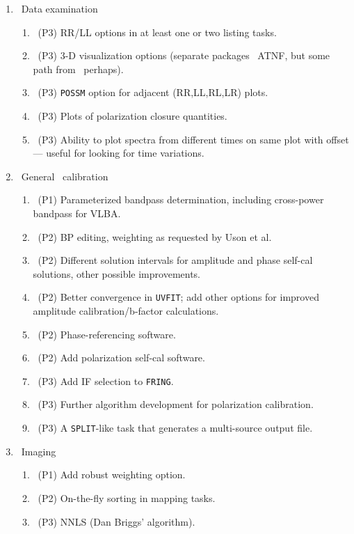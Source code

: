 \begin{enumerate}
\item\ Data examination
   \begin{enumerate}
   \item\ (P3) RR/LL options in at least one or two listing tasks.
   \item\ (P3) 3-D visualization options (separate packages \eg\ ATNF,
              but some path from \AIPS\ perhaps).
   \item\ (P3) {\tt POSSM} option for adjacent (RR,LL,RL,LR) plots.
   \item\ (P3) Plots of polarization closure quantities.
   \item\ (P3) Ability to plot spectra from different times on same
              plot with offset --- useful for looking for time
              variations.
   \end{enumerate}
\item\ General \uv\ calibration
   \begin{enumerate}
   \item\ (P1) Parameterized bandpass determination, including
              cross-power bandpass for \hbox{VLBA}.
   \item\ (P2) BP editing, weighting as requested by Uson et al.
   \item\ (P2) Different solution intervals for amplitude and phase
              self-cal solutions, other possible improvements.
   \item\ (P2) Better convergence in {\tt UVFIT}; add other options for
              improved amplitude calibration/b-factor calculations.
   \item\ (P2) Phase-referencing software.
   \item\ (P2) Add polarization self-cal software.
   \item\ (P3) Add IF selection to \hbox{{\tt FRING}}.
   \item\ (P3) Further algorithm development for polarization calibration.
   \item\ (P3) A {\tt SPLIT}-like task that generates a multi-source
              output file.
   \end{enumerate}
\item\ Imaging
   \begin{enumerate}
   \item\ (P1) Add robust weighting option.
   \item\ (P2) On-the-fly sorting in mapping tasks.
   \item\ (P3) NNLS (Dan Briggs' algorithm).
   \end{enumerate}

\end{enumerate}
